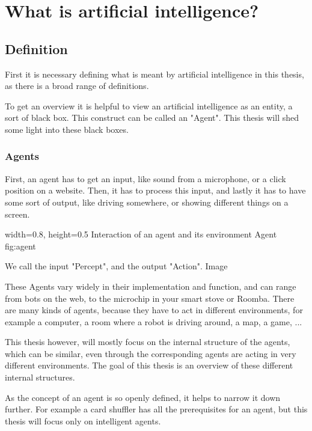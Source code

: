 \chapter{What is artificial intelligence?}
\section{Definition}
First it is necessary defining what is meant by artificial intelligence in this thesis, as there is a broad range of definitions.%

To get an overview it is helpful to view an artificial intelligence as an entity, a sort of black box. This construct can be called an "Agent". 
This thesis will shed some light into these black boxes.

\subsection{Agents}
First, an agent has to get an input, like sound from a microphone, or a click position on a website.
Then, it has to process this input, 
and lastly it has to have some sort of output, like driving somewhere, or showing different things on a screen.

    {width=0.8\textwidth, height=0.5\textheight} %
    {Interaction of an agent and its environment}   %
    {Agent}   %
    {fig:agent}    %

We call the input "Percept", and the output "Action". %
Image

These Agents vary widely in their implementation and function, and can range from bots on the web, to the microchip in your smart stove or Roomba. 
There are many kinds of agents, because they have to act in different environments, for example a computer, a room where a robot is driving around, a map, a game, ...

This thesis however, will mostly focus on the internal structure of the agents, which can be similar, even through the corresponding agents are acting in very different environments.
The goal of this thesis is an overview of these different internal structures.

As the concept of an agent is so openly defined, it helps to narrow it down further. For example a card shuffler has all the prerequisites for an agent, but this thesis will focus only on intelligent agents.

